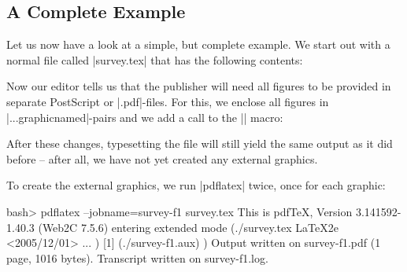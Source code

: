 \subsection{A Complete Example}

Let us now have a look at a simple, but complete example. We start out
with a normal file called |survey.tex| that has the following
contents:

Now our editor tells us that the publisher will need all figures to be
provided in separate PostScript or |.pdf|-files. For this, we 
enclose all figures in |...graphicnamed|-pairs and we add a call to
the |\pgfrealjobname| macro:

After these changes, typesetting the file will still yield the same
output as it did before -- after all, we have not yet created any
external graphics.

To create the external graphics, we run |pdflatex| twice, once for
each graphic:
\begin{codeexample}
bash> pdflatex --jobname=survey-f1 survey.tex
This is pdfTeX, Version 3.141592-1.40.3 (Web2C 7.5.6)
entering extended mode
(./survey.tex
LaTeX2e <2005/12/01>
...
) [1] (./survey-f1.aux) )
Output written on survey-f1.pdf (1 page, 1016 bytes).
Transcript written on survey-f1.log.
\end{codeexample}

